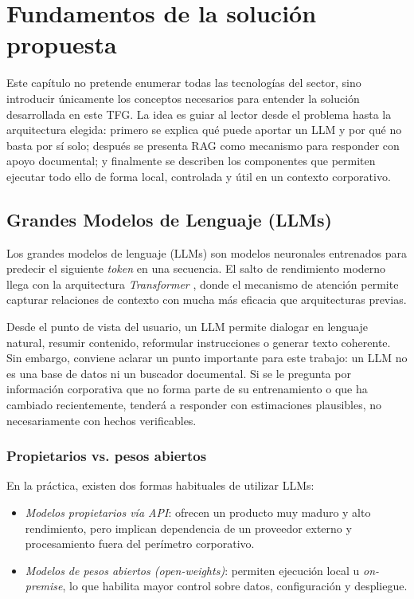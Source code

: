 \chapter{Fundamentos de la solución propuesta}
\label{cap:estado}

Este capítulo no pretende enumerar todas las tecnologías del sector, sino introducir únicamente los conceptos necesarios para entender la solución desarrollada en este TFG. La idea es guiar al lector desde el problema hasta la arquitectura elegida: primero se explica qué puede aportar un LLM y por qué no basta por sí solo; después se presenta RAG como mecanismo para responder con apoyo documental; y finalmente se describen los componentes que permiten ejecutar todo ello de forma local, controlada y útil en un contexto corporativo.

\section{Grandes Modelos de Lenguaje (LLMs)}

Los grandes modelos de lenguaje (LLMs) son modelos neuronales entrenados para predecir el siguiente \textit{token} en una secuencia. El salto de rendimiento moderno llega con la arquitectura \textit{Transformer} \cite{vaswani2017attention}, donde el mecanismo de atención permite capturar relaciones de contexto con mucha más eficacia que arquitecturas previas.

Desde el punto de vista del usuario, un LLM permite dialogar en lenguaje natural, resumir contenido, reformular instrucciones o generar texto coherente. Sin embargo, conviene aclarar un punto importante para este trabajo: un LLM no es una base de datos ni un buscador documental. Si se le pregunta por información corporativa que no forma parte de su entrenamiento o que ha cambiado recientemente, tenderá a responder con estimaciones plausibles, no necesariamente con hechos verificables.

\subsection{Propietarios vs. pesos abiertos}

En la práctica, existen dos formas habituales de utilizar LLMs:

\begin{itemize}
    \item \textit{Modelos propietarios vía API}: ofrecen un producto muy maduro y alto rendimiento, pero implican dependencia de un proveedor externo y procesamiento fuera del perímetro corporativo.
    \item \textit{Modelos de pesos abiertos (\textit{open-weights})}: permiten ejecución local u \textit{on-premise}, lo que habilita mayor control sobre datos, configuración y despliegue.
\end{itemize}

